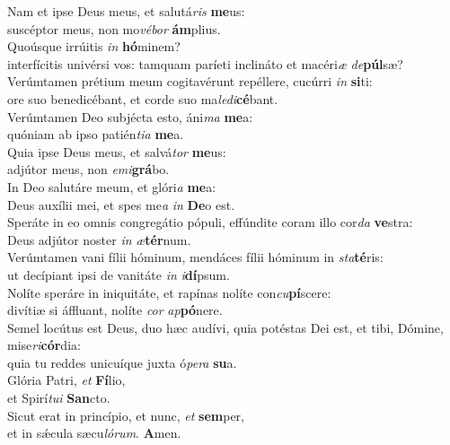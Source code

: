 \evenverse Nam et ipse Deus meus, et salutá\textit{ris} \textbf{me}us:~\*\\
\evenverse suscéptor meus, non mo\textit{vé}\textit{bor} \textbf{ám}plius.\\
\oddverse Quoúsque irrúitis \textit{in} \textbf{hó}minem?~\*\\
\oddverse interfícitis univérsi vos: tamquam paríeti inclináto et macéri\textit{æ} \textit{de}\textbf{púl}sæ?\\
\evenverse Verúmtamen prétium meum cogitavérunt repéllere, cucúrri \textit{in} \textbf{si}ti:~\*\\
\evenverse ore suo benedicébant, et corde suo ma\textit{le}\textit{di}\textbf{cé}bant.\\
\oddverse Verúmtamen Deo subjécta esto, áni\textit{ma} \textbf{me}a:~\*\\
\oddverse quóniam ab ipso patién\textit{ti}\textit{a} \textbf{me}a.\\
\evenverse Quia ipse Deus meus, et salvá\textit{tor} \textbf{me}us:~\*\\
\evenverse adjútor meus, non \textit{e}\textit{mi}\textbf{grá}bo.\\
\oddverse In Deo salutáre meum, et glóri\textit{a} \textbf{me}a:~\*\\
\oddverse Deus auxílii mei, et spes me\textit{a} \textit{in} \textbf{De}o est.\\
\evenverse Speráte in eo omnis congregátio pópuli, effúndite coram illo cor\textit{da} \textbf{ve}stra:~\*\\
\evenverse Deus adjútor noster \textit{in} \textit{æ}\textbf{tér}num.\\
\oddverse Verúmtamen vani fílii hóminum, mendáces fílii hóminum in \textit{sta}\textbf{té}ris:~\*\\
\oddverse ut decípiant ipsi de vanitáte \textit{in} \textit{i}\textbf{dí}psum.\\
\evenverse Nolíte speráre in iniquitáte, et rapínas nolíte con\textit{cu}\textbf{pí}scere:~\*\\
\evenverse divítiæ si áffluant, nolíte \textit{cor} \textit{ap}\textbf{pó}nere.\\
\oddverse Semel locútus est Deus, duo hæc audívi, quia potéstas Dei est, et tibi, Dómine, mise\textit{ri}\textbf{cór}dia:~\*\\
\oddverse quia tu reddes unicuíque juxta ó\textit{pe}\textit{ra} \textbf{su}a.\\
\evenverse Glória Patri, \textit{et} \textbf{Fí}lio,~\*\\
\evenverse et Spirí\textit{tu}\textit{i} \textbf{San}cto.\\
\oddverse Sicut erat in princípio, et nunc, \textit{et} \textbf{sem}per,~\*\\
\oddverse et in sǽcula sæcu\textit{ló}\textit{rum}. \textbf{A}men.\\
